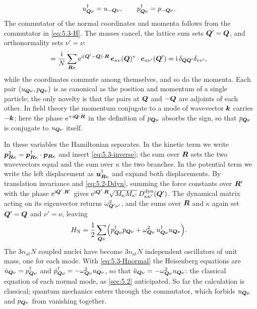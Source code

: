 \begin{equation*}
  u_{\bm{Q}\nu}^\dagger = u_{-\bm{Q}\nu} , \qquad p_{\bm{Q}\nu}^\dagger = p_{-\bm{Q}\nu} .
\end{equation*}
The commutator of the normal coordinates and momenta follows from the commutator in \cref{eq:5.3-H}. The masses cancel, the lattice sum sets $\bm{Q}' = \bm{Q}$, and orthonormality sets $\nu' = \nu$:
\begin{equation*}
  [u_{\vect{Q}\nu}, p_{\vect{Q}'\nu'}] = \frac{\ii}{N}\sum_{\vect{R}\kappa}\ee^{\ii(\vect{Q}' - \vect{Q})\cdot\vect{R}}\,\vect{e}_{\kappa\nu}(\vect{Q})^*\cdot\vect{e}_{\kappa\nu'}(\vect{Q}') = \ii\,\delta_{\vect{Q}\vect{Q}'}\delta_{\nu\nu'} ,
\end{equation*}
while the coordinates commute among themselves, and so do the momenta. Each pair $(u_{\bm{Q}\nu}, p_{\bm{Q}\nu})$ is as canonical as the position and momentum of a single particle; the only novelty is that the pairs at $\bm{Q}$ and $-\bm{Q}$ are adjoints of each other. In field theory the momentum conjugate to a mode of wavevector $\bm{k}$ carries $-\bm{k}$; here the phase $\mathrm{e}^{+\mathrm{i}\bm{Q}\cdot\bm{R}}$ in the definition of $p_{\bm{Q}\nu}$ absorbs the sign, so that $p_{\bm{Q}\nu}$ is conjugate to $u_{\bm{Q}\nu}$ itself.

In these variables the Hamiltonian separates. In the kinetic term we write $\bm{p}^2_{\bm{R}\kappa} = \bm{p}^\dagger_{\bm{R}\kappa}\cdot\bm{p}_{\bm{R}\kappa}$ and insert \cref{eq:5.3-inverse}; the sum over $\bm{R}$ sets the two wavevectors equal and the sum over $\kappa$ the two branches. In the potential term we write the left displacement as $\bm{u}^\dagger_{\bm{R}\kappa}$ and expand both displacements. By translation invariance and \cref{eq:5.2-Ddyn}, summing the force constants over $\bm{R}'$ with the phase $\mathrm{e}^{\mathrm{i}\bm{Q}'\cdot\bm{R}'}$ gives $\mathrm{e}^{\mathrm{i}\bm{Q}'\cdot\bm{R}}\sqrt{M_\kappa M_{\kappa'}}\,D^{\mathrm{dyn}}_{\kappa\kappa'}(\bm{Q}')$. The dynamical matrix acting on its eigenvector returns $\omega^2_{\bm{Q}'\nu'}$, and the sums over $\bm{R}$ and $\kappa$ again set $\bm{Q}' = \bm{Q}$ and $\nu' = \nu$, leaving
\begin{equation}
  H_{\mathrm{N}} = \frac12\sum_{\bm{Q}\nu}\Bigl(p^\dagger_{\bm{Q}\nu}p_{\bm{Q}\nu} + \omega_{\bm{Q}\nu}^2\,u^\dagger_{\bm{Q}\nu}u_{\bm{Q}\nu}\Bigr) .
  \label{eq:5.3-Hnormal}
\end{equation}
The $3n_{\mathrm{at}}N$ coupled nuclei have become $3n_{\mathrm{at}}N$ independent oscillators of unit mass, one for each mode. With \cref{eq:5.3-Hnormal} the Heisenberg equations are $\dot u_{\bm{Q}\nu} = p^\dagger_{\bm{Q}\nu}$ and $\dot p^\dagger_{\bm{Q}\nu} = -\omega_{\bm{Q}\nu}^2u_{\bm{Q}\nu}$, so that $\ddot u_{\bm{Q}\nu} = -\omega^2_{\bm{Q}\nu}u_{\bm{Q}\nu}$: the classical equation of each normal mode, as \cref{sec:5.2} anticipated. So far the calculation is classical; quantum mechanics enters through the commutator, which forbids $u_{\bm{Q}\nu}$ and $p_{\bm{Q}\nu}$ from vanishing together.

